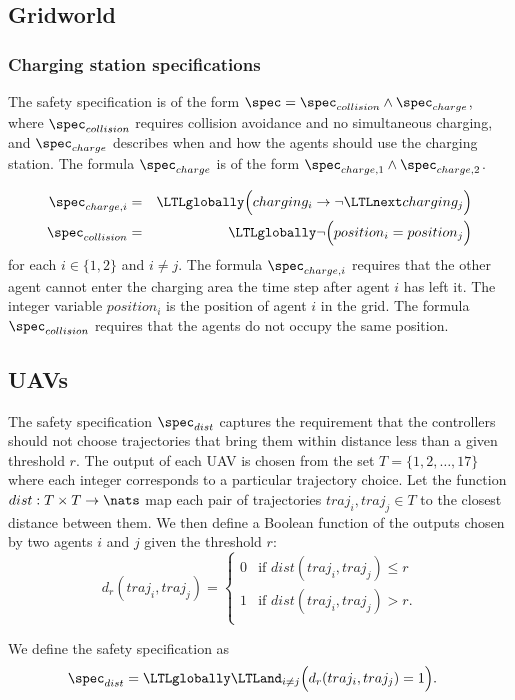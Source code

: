 

 \subsection{Gridworld}
 \label{GridworldAppendix}
 \subsubsection{Charging station specifications}  \label{Gridworldchargingappendix}


  The safety specification is of the form $\spec = \spec_{collision} \wedge \spec_{charge}$, where $\spec_{collision}$ requires collision avoidance and no simultaneous charging, and $\spec_{charge}$ describes when and how the agents should use the charging station.
  The formula $\spec_{charge}$ is of the form $\spec_{charge,1} \wedge \spec_{charge,2}$.

  \begin{align}\label{eqn:safety2}
  \spec_{charge,i} &= &\LTLglobally\Big(charging_i \rightarrow \lnot \LTLnext charging_j				\Big) \nonumber \\
  \spec_{collision} &=&\LTLglobally \lnot \Big(position_i = position_j				\Big)
  \end{align}
  for each $i \in \{1,2\}$ and $i \neq j$. The formula $\spec_{charge,i}$ requires that the other agent cannot enter the charging area the time step after agent $i$ has left it. The integer variable $position_i$ is the position of agent $i$ in the grid. The formula $\spec_{collision}$ requires that the agents do not occupy the same position.

 

\subsection{UAVs}
 \label{UAVpriorityappendix}
The safety specification $\spec_{dist}$ captures the requirement that the controllers should not choose trajectories that bring them within distance less than a given threshold $r$. The output of each UAV is chosen from the set $T = \{1,2,\ldots,17\}$ where each integer corresponds to a particular trajectory choice. Let the function $dist: T \times T \to \nats$  map each pair of trajectories $traj_i,traj_j \in T$ to the closest distance between them. We then define a Boolean function of the outputs chosen by two agents $i$ and $j$ given the threshold $r$:
  \[d_r(traj_i,traj_j) = \begin{cases}
  0 & \text{if } dist(traj_i,traj_j) \leq r\\
  1 & \text{if }  dist(traj_i,traj_j) > r.\\
  \end{cases}\]

We define the safety specification as
  \begin{align}
  \spec_{dist}&= \LTLglobally \LTLand_{i\neq j}\Big(d_r(traj_i,traj_j)= 1\Big).
  \end{align}
